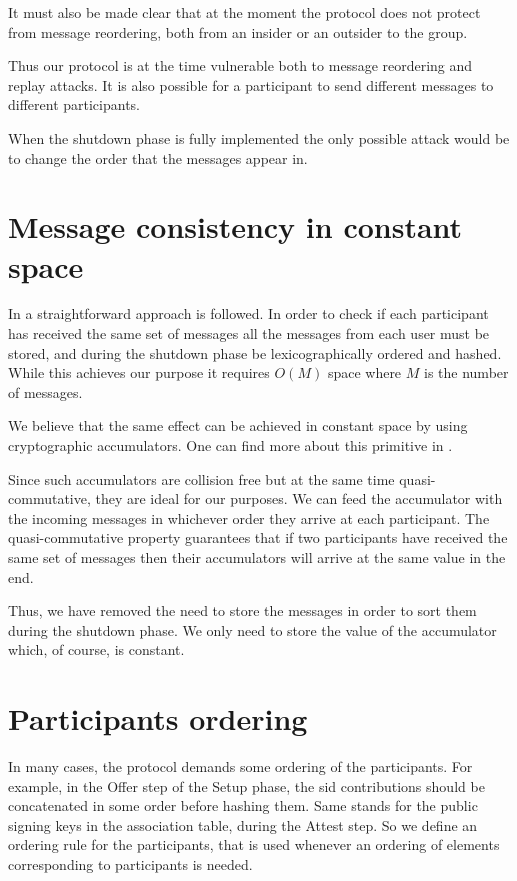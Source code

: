 \documentclass[12pt,titlepage,a4paper]{article}
\begin{document}
It must also be made clear that at the moment the protocol does not protect
from message reordering, both from an insider or an outsider to the group.

Thus our protocol is at the time vulnerable both to message reordering and replay
attacks. It is also possible for a participant to send different messages to
different participants.

When the shutdown phase is fully implemented the only possible attack would be
to change the order that the messages appear in.

\section{Message consistency in constant space}

In \cite{mpotr} a straightforward approach is followed. In order to check if
each participant has received the same set of messages all the messages from
each user must be stored, and during the shutdown phase be lexicographically
ordered and hashed. While this achieves our purpose it requires $O(M)$ space
where $M$ is the number of messages.

We believe that the same effect can be achieved in constant space by using
cryptographic accumulators. One can find more about this primitive in \cite{accum_def}.

Since such accumulators are collision free but at the same time quasi-commutative,
they are ideal for our purposes. We can feed the accumulator with the incoming
messages in whichever order they arrive at each participant. The quasi-commutative
property guarantees that if two participants have received the same set of messages
then their accumulators will arrive at the same value in the end.

Thus, we have removed the need to store the messages in order to sort them during
the shutdown phase. We only need to store the value of the accumulator which,
of course, is constant.

\section{Participants ordering}

In many cases, the protocol demands some ordering of the participants. For example, in the Offer step of the Setup phase, the sid contributions should be concatenated in some order before hashing them. Same stands for the public signing keys in the association table, during the Attest step. So we define an ordering rule for the participants, that is used whenever an ordering of elements corresponding to participants is needed. \\
\end{document}
